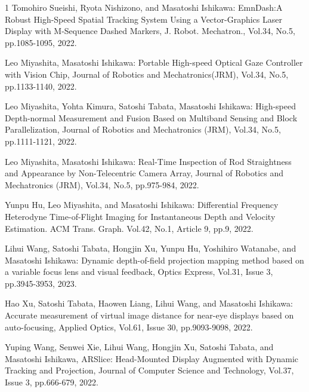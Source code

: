 \begin{雑誌論文}{1}
Tomohiro Sueishi, Ryota Nishizono, and Masatoshi Ishikawa: EmnDash:A Robust High-Speed Spatial Tracking System Using a Vector-Graphics Laser Display with M-Sequence Dashed Markers, J. Robot. Mechatron., Vol.34, No.5, pp.1085-1095, 2022.


Leo Miyashita, Masatoshi Ishikawa: Portable High-speed Optical Gaze Controller with Vision Chip, Journal of Robotics and Mechatronics(JRM), Vol.34, No.5, pp.1133-1140, 2022.

Leo Miyashita, Yohta Kimura, Satoshi Tabata, Masatoshi Ishikawa: High-speed Depth-normal Measurement and Fusion Based on Multiband Sensing and Block Parallelization, Journal of Robotics and Mechatronics (JRM), Vol.34, No.5, pp.1111-1121, 2022.

Leo Miyashita, Masatoshi Ishikawa: Real-Time Inspection of Rod Straightness and Appearance by Non-Telecentric Camera Array, Journal of Robotics and Mechatronics (JRM), Vol.34, No.5, pp.975-984, 2022.

Yunpu Hu, Leo Miyashita, and Masatoshi Ishikawa: Differential Frequency Heterodyne Time-of-Flight Imaging for Instantaneous Depth and Velocity Estimation. ACM Trans. Graph. Vol.42, No.1, Article 9, pp.9, 2022.


Lihui Wang, Satoshi Tabata, Hongjin Xu, Yunpu Hu, Yoshihiro Watanabe, and Masatoshi Ishikawa: Dynamic depth-of-field projection mapping method based on a variable focus lens and visual feedback, Optics Express, Vol.31, Issue 3, pp.3945-3953, 2023.

Hao Xu, Satoshi Tabata, Haowen Liang, Lihui Wang, and Masatoshi Ishikawa: Accurate measurement of virtual image distance for near-eye displays based on auto-focusing, Applied Optics, Vol.61, Issue 30, pp.9093-9098, 2022.

Yuping Wang, Senwei Xie, Lihui Wang, Hongjin Xu, Satoshi Tabata, and Masatoshi Ishikawa, ARSlice: Head-Mounted Display Augmented with Dynamic Tracking and Projection, Journal of Computer Science and Technology, Vol.37, Issue 3, pp.666-679, 2022.




\end{雑誌論文}
